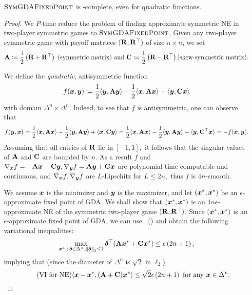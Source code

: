 \begin{theorem}\label{thm:symmetricminmax} 
$\textsc{SymGDAFixedPoint}$ is \PPAD-complete, even for quadratic functions.
\end{theorem}
\begin{proof}
We $P$-time reduce the problem of finding approximate symmetric NE in two-player symmetric games to $\textsc{SymGDAFixedPoint}$.  
Given any two-player symmetric game with payoff matrices $(\mathbf{R},\mathbf{R}^{\top})$ of size $n\times n$, we set 
\begin{equation}\label{eq:matrices}
\mathbf{A} \coloneqq \frac{1}{2} \left(\mathbf{R}+\mathbf{R}^{\top}\right) \textrm{ (symmetric matrix) and } 
\mathbf{C} \coloneqq \frac{1}{2}\left(\mathbf{R}-\mathbf{R}^{\top}\right) \textrm{(skew-symmetric matrix)}.
\end{equation}

\noindent We define the \emph{quadratic}, antisymmetric function
\begin{equation}
    \label{eq:hard-quad}
 f({\bm{x}},{\bm{y}}) \coloneqq \frac{1}{2} \langle {\bm{y}}, \mathbf{A}{\bm{y}} \rangle - \frac{1}{2} \langle {\bm{x}}, \mathbf{A}{\bm{x}} \rangle + \langle {\bm{y}}, \mathbf{C}{\bm{x}} \rangle   
\end{equation}
with domain $\Delta^n \times \Delta^n$. Indeed, to see that $f$ is antisymmetric, one can observe that $$f({\bm{y}},{\bm{x}}) = \frac{1}{2} \langle {\bm{x}}, \mathbf{A} {\bm{x}} \rangle - \frac{1}{2} \langle {\bm{y}}, \mathbf{A} {\bm{y}} \rangle + \langle {\bm{x}}, \mathbf{C} {\bm{y}} \rangle = \frac{1}{2} \langle {\bm{x}}, \mathbf{A}{\bm{x}} \rangle -\frac{1}{2} \langle {\bm{y}}, \mathbf{A} {\bm{y}} \rangle - \langle {\bm{y}}, \mathbf{C}^{\top} {\bm{x}} \rangle = -f({\bm{x}},{\bm{y}}).$$
Assuming that all entries of $\mathbf{R}$ lie in $[-1,1],$ it follows that the singular values of $\mathbf{A}$ and $\mathbf{C}$ are bounded by $n.$ As a result $f$ and $\nabla_{{\bm{x}}} f = -\mathbf{A}{\bm{x}}-\mathbf{C}{\bm{y}}, \nabla_{{\bm{y}}} f = \mathbf{A}{\bm{y}} +\mathbf{C}{\bm{x}}$ are polynomial time computable and continuous, and $\nabla_{{\bm{x}}} f, \nabla_{{\bm{y}}}f$ are $L$-Lipschitz for $L \leq 2n,$ thus $f$ is $4n$-smooth.

We assume ${\bm{x}}$ is the minimizer and ${\bm{y}}$ is the maximizer, and let $({\bm{x}}^*,{\bm{x}}^*)$ be an $\epsilon$-approximate fixed point of GDA. We shall show that $({\bm{x}}^*,{\bm{x}}^*)$ is an $4n\epsilon$-approximate NE of the symmetric two-player game $(\mathbf{R},\mathbf{R}^{\top})$. Since $({\bm{x}}^*,{\bm{x}}^*)$ is an $\epsilon$-approximate fixed point of GDA, we can use~ () and obtain the following variational inequalities:
\begin{equation*}
\max_{{\bm{x}}^*+\bm{\delta} \in \Delta^n, \left\| \bm{\delta} \right\|_2\leq 1} \bm{\delta}^{\top} (\mathbf{A}{\bm{x}}^*+\mathbf{C}{\bm{x}}^*)\leq \epsilon\left(2n+1\right),
\end{equation*}
implying that (since the diameter of $\Delta^n$ is $\sqrt{2}$ in $\ell_2$)
\begin{equation}
\tag{VI for NE}\label{eq:VIforNE}
\langle {\bm{x}} - {\bm{x}}^*,(\mathbf{A}+\mathbf{C}){\bm{x}}^*  \rangle \leq \sqrt{2}\epsilon\left(2n+1\right) \textrm{ for any }{\bm{x}}\in\Delta^n. 
\end{equation}


\end{proof}
